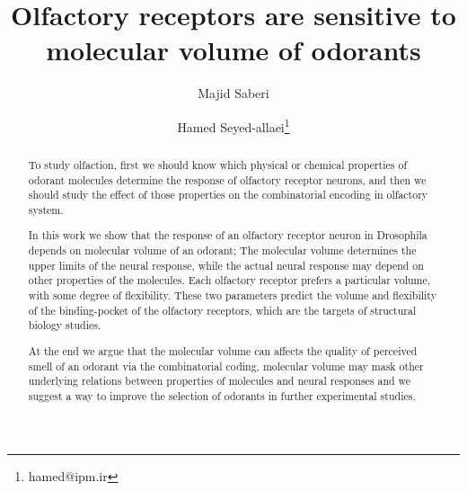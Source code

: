 \documentclass[11pt]{paper} %
\title{Olfactory receptors are sensitive to molecular volume of odorants}
\author{Majid Saberi \and Hamed Seyed-allaei\thanks{hamed@ipm.ir}}
\begin{document}
\maketitle

\begin{abstract}
        To study olfaction,
        first we should know which physical or chemical properties of odorant molecules determine 
	the response of olfactory receptor neurons, 
	and then we should study the effect of those properties on the combinatorial encoding in olfactory system.
	
	In this work we show that the response of an olfactory receptor neuron in Drosophila depends on molecular volume of an odorant;  
	The molecular volume determines the upper limits of the neural response, 
	while the actual neural response may depend on other properties of the molecules.
	Each olfactory receptor prefers a particular volume, 
	with some degree of flexibility.
	These two parameters predict the volume and flexibility of the binding-pocket of the olfactory receptors, 
	which are the targets of structural biology studies. 
	
	At the end we argue that the molecular volume can affects the quality of perceived smell of an odorant via the combinatorial coding,
	molecular volume may mask other underlying relations between properties of molecules and neural responses 
	and we suggest a way to improve the selection of odorants in further experimental studies.
	

\end{abstract}
\end{document}
